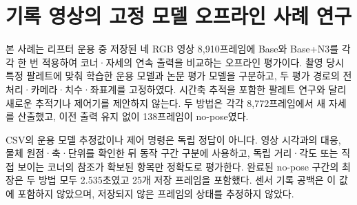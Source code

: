 \section{기록 영상의 고정 모델 오프라인 사례 연구}\label{sec:case}
본 사례는 리프터 운용 중 저장된 네 RGB 영상 8,910프레임에 Base와 Base+N3를 각각 한 번 적용하여 코너·자세의 연속 출력을 비교하는 오프라인 평가이다. 촬영 당시 특정 팔레트에 맞춰 학습한 운용 모델과 논문 평가 모델을 구분하고, 두 평가 경로의 전처리·카메라·치수·좌표계를 고정하였다. 시간축 추적을 포함한 팔레트 연구\cite{mohamed2020}와 달리 새로운 추적기나 제어기를 제안하지 않는다. 두 방법은 각각 8,772프레임에서 새 자세를 산출했고, 이전 출력 유지 없이 138프레임이 no-pose였다.

CSV의 운용 모델 추정값이나 제어 명령은 독립 정답이 아니다. 영상 시각과의 대응, 물체 원점·축·단위를 확인한 뒤 동작 구간 구분에 사용하고, 독립 거리·각도 또는 직접 보이는 코너의 참조가 확보된 항목만 정확도로 평가한다. 완료된 no-pose 구간의 최장은 두 방법 모두 2.535초였고 25개 저장 프레임을 포함했다. 센서 기록 공백은 이 값에 포함하지 않았으며, 저장되지 않은 프레임의 상태를 추정하지 않았다.

